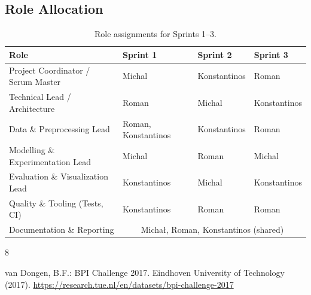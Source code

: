 \documentclass[runningheads]{llncs}
\begin{document}
\subsection{Role Allocation}

\begin{table}[H]
    \caption{Role assignments for Sprints 1--3.}\label{tab:roles}
    \centering
    \begin{tabular}{@{}llll@{}}
        \toprule
        \textbf{Role}                      & \textbf{Sprint 1}                                        & \textbf{Sprint 2} & \textbf{Sprint 3} \\
        \midrule
        Project Coordinator / Scrum Master & Michal                                                   & Konstantinos      & Roman             \\
        Technical Lead / Architecture      & Roman                                                    & Michal            & Konstantinos      \\
        Data \& Preprocessing Lead         & Roman, Konstantinos                                      & Konstantinos      & Roman             \\
        Modelling \& Experimentation Lead  & Michal                                                   & Roman             & Michal            \\
        Evaluation \& Visualization Lead   & Konstantinos                                             & Michal            & Konstantinos      \\
        Quality \& Tooling (Tests, CI)     & Konstantinos                                             & Roman             & Roman             \\
        Documentation \& Reporting         & \multicolumn{3}{c}{Michał, Roman, Konstantinos (shared)}                                         \\
        \bottomrule
    \end{tabular}
\end{table}



\begin{thebibliography}{8}

    van Dongen, B.F.: BPI Challenge 2017. Eindhoven University of Technology (2017). \url{https://research.tue.nl/en/datasets/bpi-challenge-2017}



\end{thebibliography}
\end{document}
